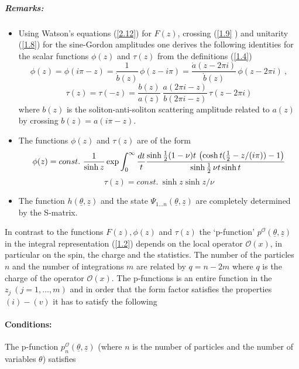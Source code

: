 \documentclass[a4paper,a4paper]{article}
\begin{document}
\subparagraph{Remarks:}

\begin{itemize}
\item  Using Watson's equations (\ref{2.12}) for $F(z)$, crossing (\ref{1.9}%
) and unitarity (\ref{1.8}) for the sine-Gordon amplitudes one derives the
following identities for the scalar functions $\phi (z)$ and $\tau (z)$ from
the definitions (\ref{1.4}) 
\begin{equation}
\phi (z)=\phi (i\pi -z)=\frac{1}{\dot{b}(z)}\,\phi (z-i\pi )=\frac{\dot{a}%
(z-2\pi i)}{\dot{b}(z)}\,\phi (z-2\pi i)~,  \label{1.6}
\end{equation}
\[
\tau (z)=\tau (-z)=\frac{b(z)}{a(z)}\,\frac{a(2\pi i-z)}{b(2\pi i-z)}\,\tau
(z-2\pi i) 
\]
where $b(z)$ is the soliton-anti-soliton scattering amplitude related to $%
a(z)$ by crossing $b(z)=a(i\pi -z)$.

\item  The functions $\phi (z)$ and $\tau (z)$ are of the form 
\[
\phi (z)=const.~\frac{1}{\sinh z}\exp \int_{0}^{\infty }\frac{dt}{t}\frac{%
\sinh \frac{1}{2}(1-\nu )t\,\left( \cosh t(\frac{1}{2}-z/(i\pi ))-1\right) }{%
\sinh \frac{1}{2}\,\nu t\sinh t} 
\]
\[
\tau (z)=const.~\sinh z\sinh z/\nu 
\]

\item  The function $h(\underline{\theta },{\underline{z}})$ and the state $%
\Psi _{1\dots n}(\underline{\theta },{\underline{z}})$ are completely
determined by the S-matrix.
\end{itemize}

In contrast to the functions $F(z),\phi (z)$ and $\tau (z)$ the `p-function' 
$p^{\mathcal{O}}(\underline{\theta },{\underline{z}})$ in the integral
representation (\ref{1.2}) depends on the local operator $\mathcal{O}(x)$,
in particular on the spin, the charge and the statistics. The number of the
particles $n$ and the number of integrations $m$ are related by $q=n-2m$
where $q$ is the charge of the operator $\mathcal{O}(x)$. The p-functions is
an entire function in the $z_{j}~(j=1,\dots ,m)$ and in order that the form
factor satisfies the properties $(i)-(v)$ it has to satisfy the following

\paragraph{Conditions:\label{p}}

The p-function $p_{n}^{\mathcal{O}}(\underline{\theta },\underline{z})$
(where $n$ is the number of particles and the number of variables $\theta $)
satisfies
\end{document}
